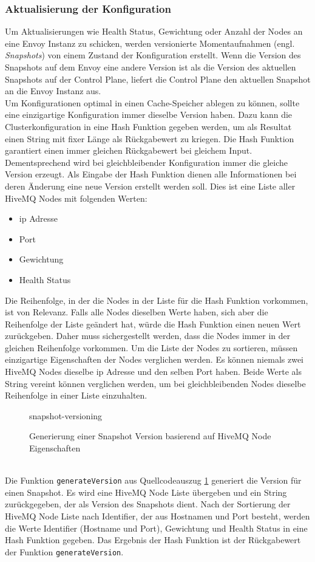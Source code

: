 \subsubsection{Aktualisierung der Konfiguration}
Um Aktualisierungen wie Health Status, Gewichtung oder Anzahl der Nodes an eine Envoy Instanz zu schicken, werden versionierte Momentaufnahmen (engl. \textit{Snapshots}) von einem Zustand der Konfiguration erstellt. Wenn die Version des Snapshots auf dem Envoy eine andere Version ist als die Version des aktuellen Snapshots auf der Control Plane, liefert die Control Plane den aktuellen Snapshot an die Envoy Instanz aus.
\\
Um Konfigurationen optimal in einen Cache-Speicher ablegen zu können, sollte eine einzigartige Konfiguration immer dieselbe Version haben.
Dazu kann die Clusterkonfiguration in eine Hash Funktion gegeben werden, um als Resultat einen String mit fixer Länge als Rückgabewert zu kriegen. Die Hash Funktion garantiert einen immer gleichen Rückgabewert bei gleichem Input. Dementsprechend wird bei gleichbleibender Konfiguration immer die gleiche Version erzeugt.
Als Eingabe der Hash Funktion dienen alle Informationen bei deren Änderung eine neue Version erstellt werden soll. Dies ist eine Liste aller HiveMQ Nodes mit folgenden Werten:
\begin{itemize}
  \item \ac{ip} Adresse
  \item Port
  \item Gewichtung
  \item Health Status
\end{itemize}
Die Reihenfolge, in der die Nodes in der Liste für die Hash Funktion vorkommen, ist von Relevanz. Falls alle Nodes dieselben Werte haben, sich aber die Reihenfolge der Liste geändert hat, würde die Hash Funktion einen neuen Wert zurückgeben. Daher muss sichergestellt werden, dass die Nodes immer in der gleichen Reihenfolge vorkommen. Um die Liste der Nodes zu sortieren, müssen einzigartige Eigenschaften der Nodes verglichen werden.
Es können niemals zwei HiveMQ Nodes dieselbe \ac{ip} Adresse und den selben Port haben. Beide Werte als String vereint können verglichen werden, um bei gleichbleibenden Nodes dieselbe Reihenfolge in einer Liste einzuhalten.
\begin{figure}
    {snapshot-versioning}
    \caption{Generierung einer Snapshot Version basierend auf HiveMQ Node Eigenschaften}
    \label{code:snapshot-versioning}
\end{figure}
\\
Die Funktion \verb|generateVersion| aus Quellcodeauszug \ref{code:snapshot-versioning} generiert die Version für einen Snapshot. Es wird eine HiveMQ Node Liste übergeben und ein String zurückgegeben, der als Version des Snapshots dient. Nach der Sortierung der HiveMQ Node Liste nach Identifier, der aus Hostnamen und Port besteht, werden die Werte Identifier (Hostname und Port), Gewichtung und Health Status in eine Hash Funktion gegeben. Das Ergebnis der Hash Funktion ist der Rückgabewert der Funktion \verb|generateVersion|.

